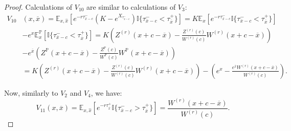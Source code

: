 \documentclass[10pt]{amsart}
\def\E{{\mathbb{E}}}
\def\Eq{{\mathbb{E}
		_{x,\hat{x}}}}
\def\P{{\mathbb{P}}}
\def \R{{{\rm I{\!}\rm R}}}
\def \I{{\mathbb{I}}}
\def\P{{\mathbb P}} \def\le{\left} \def\ri{\right} \def\i{\infty}
\def\E{{\mathbb E}} \def\PP{\mc P} \def\Z{{\mathbb Z}} \def\R{{\mathbb R}}
\begin{document}
\begin{proof}
			Calculations of $V_{10}$ are similar to calculations of $V_3$:
			\begin{align}
				\nonumber V_{10}&(x,\overline{x}) = \Eq\left[ e^{-r\tau_{\overline{x}-c}^-} \left( K - e^{X_{\tau_{\overline{x}-c}^-}} \right) \I
				\{ \tau_{\overline{x}-c}^- < \tau_{\overline{x}}^+ \} \right] = K\E_x\left[ e^{-r\tau_{\overline{x}-c}^-} \I
				\{ \tau_{\overline{x}-c}^- < \tau_{\overline{x}}^+ \} \right] \\
				\nonumber &  - e^x \E^\P_x\left[  \I
				\{ \tau_{\overline{x}-c}^- < \tau_{\overline{x}}^+ \} \right] =  K\left( Z^{(r)}(x+c-\overline{x}) - \frac{Z^{(r)}(c)}{W^{(r)}(c)}W^{(r)}(x+c-\overline{x}) \right) \\
				\nonumber &  -e^{\overline{x}}\left( Z^{\P}(x+c-\overline{x}) - \frac{Z^{\P}(c)}{W^{\P}(c)}W^{\P}(x+c-\overline{x}) \right) \\
				& = K\left( Z^{(r)}(x+c-\overline{x}) - \frac{Z^{(r)}(c)}{W^{(r)}(c)}W^{(r)}(x+c-\overline{x}) \right) - \left( e^x - \frac{e^{\overline{x}}W^{(r)}(x+c-\overline{x})}{W^{(r)}(c)} \right). \label{V10}
			\end{align}
			
			Now, similarly to $V_2$ and $V_4$, we have:
			\begin{equation}\label{V11}
				V_{11}(x, \overline{x}) = \Eq\left[ e^{-r\tau_{\overline{x}}^+} \I
				\{ \tau_{\overline{x}-c}^- > \tau_{\overline{x}}^+ \} \right] = \frac{W^{(r)}(x+c-\overline{x})}{W^{(r)}(c)}.
			\end{equation}
			

\end{proof}
\end{document}
